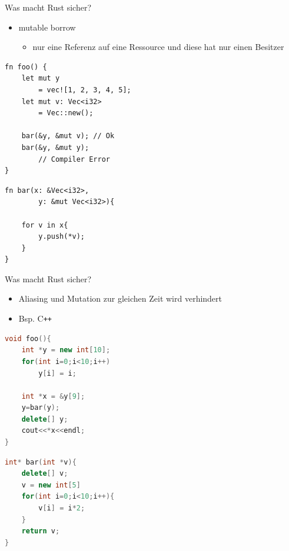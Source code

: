 \documentclass[12pt]{beamer}
\begin{document}
\begin{frame}[fragile=singleslide]{Was macht Rust sicher?}
	\begin{itemize}
	    \item mutable borrow  
	    \begin{itemize}
	        \item nur eine Referenz auf eine Ressource und diese hat nur einen Besitzer
	    \end{itemize}
	\end{itemize}
\begin{center}
\hspace{3pt}
\begin{minipage}[t]{.48\textwidth}
\begin{lstlisting}
fn foo() {	
	let mut y 
		= vec![1, 2, 3, 4, 5];
	let mut v: Vec<i32> 
		= Vec::new();
		
	bar(&y, &mut v); // Ok
	bar(&y, &mut y); 
		// Compiler Error
}
\end{lstlisting}				
\end{minipage}
\hspace{3pt}
\begin{minipage}[t]{.47\textwidth}
\begin{lstlisting}
fn bar(x: &Vec<i32>, 
		y: &mut Vec<i32>){
	
	for v in x{
		y.push(*v);
	}
}
\end{lstlisting}				
\end{minipage}
\end{center}
\end{frame}

\begin{frame}[fragile=singleslide]{Was macht Rust sicher?}
\begin{itemize}
    \item Aliasing und Mutation zur gleichen Zeit wird verhindert
   	\item Bsp. C\texttt{++}   	
\end{itemize}
\begin{center}
\hspace{3pt}
\begin{minipage}[t]{.47\textwidth}
\begin{lstlisting}[language=C++,otherkeywords={}]
void foo(){ 
	int *y = new int[10];	
	for(int i=0;i<10;i++)
		y[i] = i;

	int *x = &y[9];
	y=bar(y);	
	delete[] y;		
	cout<<*x<<endl;
}
\end{lstlisting}				
\end{minipage}
\hspace{3pt}
\begin{minipage}[t]{.47\textwidth}
\begin{lstlisting}[language=C++,otherkeywords={}]
int* bar(int *v){
	delete[] v;	
	v = new int[5]	
	for(int i=0;i<10;i++){
		v[i] = i*2;
	}	
	return v;
}
\end{lstlisting}				
\end{minipage}
\end{center}
\end{frame}
\end{document}
